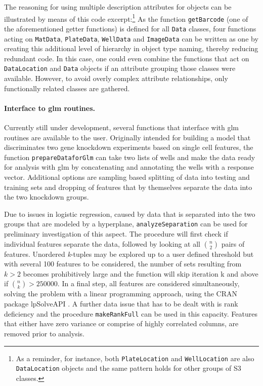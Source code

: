 The reasoning for using multiple description attributes for objects can be illustrated by means of this code excerpt:\footnote{As a reminder, for instance, both \texttt{PlateLocation} and \texttt{WellLocation} are also \texttt{DataLocation} objects and the same pattern holds for other groups of S3 classes.} As the function \texttt{getBarcode} (one of the aforementioned getter functions) is defined for all \texttt{Data} classes, four functions acting on \texttt{MatData}, \texttt{PlateData}, \texttt{WellData} and \texttt{ImageData} can be written as one by creating this additional level of hierarchy in object type naming, thereby reducing redundant code. In this case, one could even combine the functions that act on \texttt{DataLocation} and \texttt{Data} objects if an attribute grouping those classes were available. However, to avoid overly complex attribute relationships, only functionally related classes are gathered.

\paragraph{Interface to \acrshort{glm} routines.}
Currently still under development, several functions that interface with \gls{glm} routines are available to the user. Originally intended for building a model that discriminates two gene knockdown experiments based on single cell features, the function \texttt{prepareDataforGlm} can take two lists of wells and make the data ready for analysis with \gls{glm} by concatenating and annotating the wells with a response vector. Additional options are sampling based splitting of data into testing and training sets and dropping of features that by themselves separate the data into the two knockdown groups.

Due to issues in logistic regression, caused by data that is separated into the two groups that are modeled by a hyperplane, \texttt{analyzeSeparation} can be used for preliminary investigation of this aspect. The procedure will first check if individual features separate the data, followed by looking at all $n \choose 2$ pairs of features. Unordered \textit{k}-tuples may be explored up to a user defined threshold but with several 100 features to be considered, the number of sets resulting from $k > 2$ becomes prohibitively large and the function will skip iteration k and above if ${n \choose k} > 250000$. In a final step, all features are considered simultaneously, solving the problem with a linear programming approach, using the CRAN package lpSolveAPI \citep{Konis2007,Konis2014}. A further data issue that has to be dealt with is rank deficiency and the procedure \texttt{makeRankFull} can be used in this capacity. Features that either have zero variance or comprise of highly correlated columns, are removed prior to analysis.

